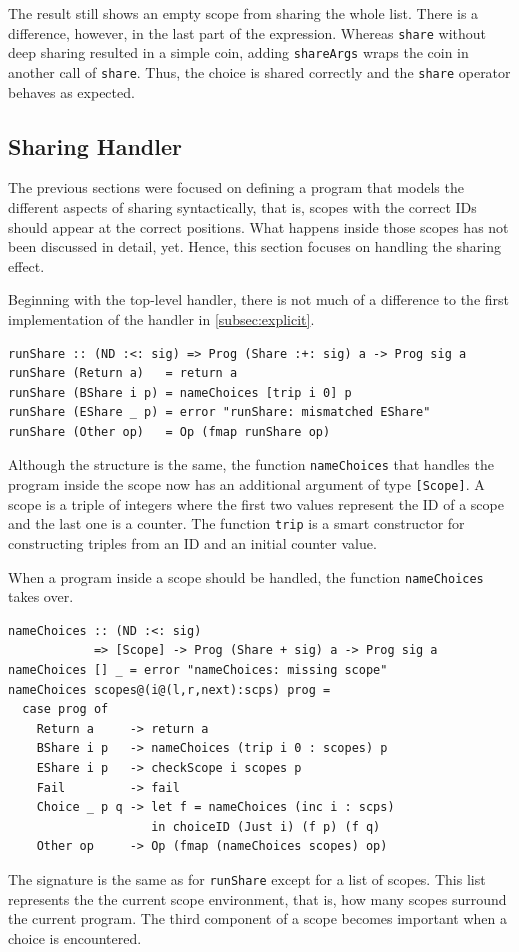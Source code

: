\documentclass[a4paper, 11pt, fleqn, twoside, abstract=on]{scrreprt}
\newcommand{\hinl}[1]{\texttt{#1}}
\begin{document}
The result still shows an empty scope from sharing the whole list.
There is a difference, however, in the last part of the expression.
Whereas \hinl{share} without deep sharing resulted in a simple coin, adding \hinl{shareArgs} wraps the coin in another call of \hinl{share}.
Thus, the choice is shared correctly and the \hinl{share} operator behaves as expected.

\subsection{Sharing Handler}
The previous sections were focused on defining a program that models the different aspects of sharing syntactically, that is, scopes with the correct IDs should appear at the correct positions.
What happens inside those scopes has not been discussed in detail, yet.
Hence, this section focuses on handling the sharing effect.

Beginning with the top-level handler, there is not much of a difference to the first implementation of the handler in \autoref{subsec:explicit}.

\begin{verbatim}
runShare :: (ND :<: sig) => Prog (Share :+: sig) a -> Prog sig a
runShare (Return a)   = return a
runShare (BShare i p) = nameChoices [trip i 0] p
runShare (EShare _ p) = error "runShare: mismatched EShare"
runShare (Other op)   = Op (fmap runShare op)
\end{verbatim}
\noindent
Although the structure is the same, the function \hinl{nameChoices} that handles the program inside the scope now has an additional argument of type \hinl{[Scope]}.
A scope is a triple of integers where the first two values represent the ID of a scope and the last one is a counter.
The function \hinl{trip} is a smart constructor for constructing triples from an ID and an initial counter value.

When a program inside a scope should be handled, the function \hinl{nameChoices} takes over.

\begin{verbatim}
nameChoices :: (ND :<: sig)
            => [Scope] -> Prog (Share + sig) a -> Prog sig a
nameChoices [] _ = error "nameChoices: missing scope"
nameChoices scopes@(i@(l,r,next):scps) prog =
  case prog of
    Return a     -> return a
    BShare i p   -> nameChoices (trip i 0 : scopes) p
    EShare i p   -> checkScope i scopes p
    Fail         -> fail
    Choice _ p q -> let f = nameChoices (inc i : scps)
                    in choiceID (Just i) (f p) (f q)
    Other op     -> Op (fmap (nameChoices scopes) op)
\end{verbatim}
\noindent
The signature is the same as for \hinl{runShare} except for a list of scopes.
This list represents the the current scope environment, that is, how many scopes surround the current program.
The third component of a scope becomes important when a choice is encountered.
\end{document}
